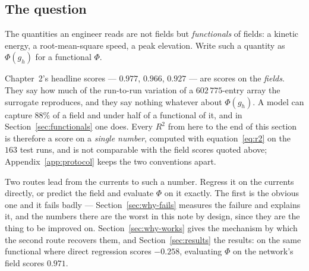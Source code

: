 \documentclass[11pt,a4paper]{article}
\theoremstyle{plain}
\theoremstyle{definition}
\theoremstyle{remark}
\begin{document}
\subsection{The question}
\label{auto:the-question}

The quantities an engineer reads are not fields but \emph{functionals} of fields:
a kinetic energy, a root-mean-square speed, a peak elevation. Write such a
quantity as $\Phi(g_h)$ for a functional $\Phi$.

Chapter~2's headline scores --- $0.977$, $0.966$, $0.927$ --- are scores on the
\emph{fields}. They say how much of the run-to-run variation of a
$602\,775$-entry array the surrogate reproduces, and they say nothing whatever
about $\Phi(g_h)$. A model can capture $88\%$ of a field and under half of a
functional of it, and in Section~\ref{sec:functionals} one does. Every $R^2$
from here to the end of this section is therefore a score on a \emph{single
number}, computed with equation~\eqref{eq:r2} on the $163$ test runs, and is not
comparable with the field scores quoted above; Appendix~\ref{app:protocol} keeps
the two conventions apart.

Two routes lead from the currents to such a number. Regress it on the currents
directly, or predict the field and evaluate $\Phi$ on it exactly. The first is
the obvious one and it fails badly --- Section~\ref{sec:why-fails} measures the
failure and explains it, and the numbers there are the worst in this note by
design, since they are the thing to be improved on. Section~\ref{sec:why-works}
gives the mechanism by which the second route recovers them, and
Section~\ref{sec:results} the results: on the same functional where direct
regression scores $-0.258$, evaluating $\Phi$ on the network's field scores
$0.971$.
\end{document}
